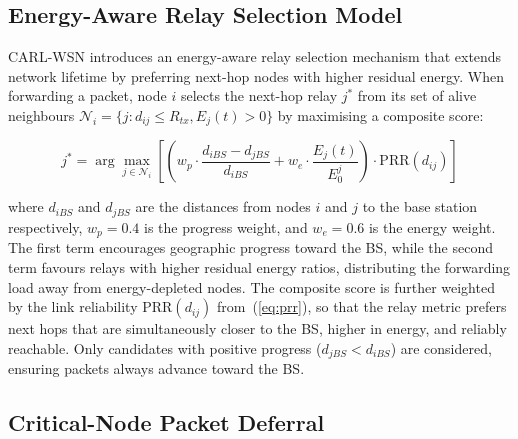 \documentclass[12pt]{article}
\begin{document}
\subsection{Energy-Aware Relay Selection Model}

CARL-WSN introduces an energy-aware relay selection mechanism that
extends network lifetime by preferring next-hop nodes with higher
residual energy. When forwarding a packet, node $i$ selects the
next-hop relay $j^*$ from its set of alive neighbours
$\mathcal{N}_i = \{j : d_{ij} \leq R_{tx}, E_j(t) > 0\}$ by
maximising a composite score:

\begin{equation}
j^* = \arg\max_{j \in \mathcal{N}_i} \left[
  \left( w_p \cdot \frac{d_{iBS} - d_{jBS}}{d_{iBS}} +
  w_e \cdot \frac{E_j(t)}{E_0^j} \right) \cdot \mathrm{PRR}(d_{ij})
\right]
\label{eq:relay}
\end{equation}

where $d_{iBS}$ and $d_{jBS}$ are the distances from nodes $i$ and
$j$ to the base station respectively, $w_p = 0.4$ is the progress
weight, and $w_e = 0.6$ is the energy weight. The first term
encourages geographic progress toward the BS, while the second term
favours relays with higher residual energy ratios, distributing the
forwarding load away from energy-depleted nodes. The composite score
is further weighted by the link reliability $\mathrm{PRR}(d_{ij})$
from~(\ref{eq:prr}), so that the relay metric prefers next hops that
are simultaneously closer to the BS, higher in energy, and reliably
reachable. Only candidates with positive progress
($d_{jBS} < d_{iBS}$) are considered, ensuring packets always advance
toward the BS.

\subsection{Critical-Node Packet Deferral}
\end{document}
